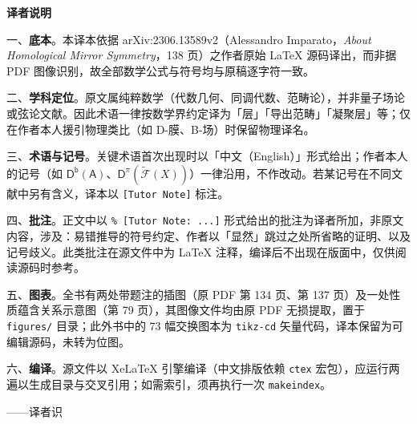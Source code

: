 \begin{center}
\begin{minipage}{0.92\textwidth}
\small
\noindent\textbf{译者说明}

\vspace{0.6em}
\noindent 一、\textbf{底本}。本译本依据 arXiv:2306.13589v2（Alessandro Imparato，\textit{About Homological Mirror Symmetry}，138 页）之作者原始 \LaTeX{} 源码译出，而非据 PDF 图像识别，故全部数学公式与符号均与原稿逐字符一致。

\vspace{0.4em}
\noindent 二、\textbf{学科定位}。原文属纯粹数学（代数几何、同调代数、范畴论），并非量子场论或弦论文献。因此术语一律按数学界约定译为「层」「导出范畴」「凝聚层」等；仅在作者本人援引物理类比（如 D-膜、B-场）时保留物理译名。

\vspace{0.4em}
\noindent 三、\textbf{术语与记号}。关键术语首次出现时以「中文（English）」形式给出；作者本人的记号（如 $\mathsf{D}^{\mathsf{b}}(\mathsf{A})$、$\mathsf{D}^\pi(\widetilde{\mathscr{F}}(X))$）一律沿用，不作改动。若某记号在不同文献中另有含义，译本以 \texttt{[Tutor Note]} 标注。

\vspace{0.4em}
\noindent 四、\textbf{批注}。正文中以 \texttt{\%\,[Tutor Note: ...]} 形式给出的批注为译者所加，非原文内容，涉及：易错推导的符号约定、作者以「显然」跳过之处所省略的证明、以及记号歧义。此类批注在源文件中为 \LaTeX{} 注释，编译后不出现在版面中，仅供阅读源码时参考。

\vspace{0.4em}
\noindent 五、\textbf{图表}。全书有两处带题注的插图（原 PDF 第 134 页、第 137 页）及一处性质蕴含关系示意图（第 79 页），其图像文件均由原 PDF 无损提取，置于 \texttt{figures/} 目录；此外书中的 73 幅交换图本为 \texttt{tikz-cd} 矢量代码，译本保留为可编辑源码，未转为位图。

\vspace{0.4em}
\noindent 六、\textbf{编译}。源文件以 XeLaTeX 引擎编译（中文排版依赖 \texttt{ctex} 宏包），应运行两遍以生成目录与交叉引用；如需索引，须再执行一次 \texttt{makeindex}。
\end{minipage}
\end{center}

\vspace*{1cm}
\begin{flushright}
\small ——译者识
\end{flushright}


\newpage
{}
\thispagestyle{plain}

